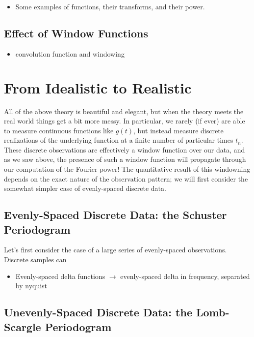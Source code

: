 \documentclass[preprint]{aastex}
\begin{document}
\begin{itemize}
\item Some examples of functions, their transforms, and their power.
\end{itemize}

\subsection{Effect of Window Functions}

\begin{itemize}
\item convolution function and windowing
\end{itemize}

\section{From Idealistic to Realistic}

All of the above theory is beautiful and elegant, but when the theory meets the real world things get a bit more messy.
In particular, we rarely (if ever) are able to measure continuous functions like $g(t)$, but instead measure discrete realizations of the underlying function at a finite number of particular times $t_n$.
These discrete observations are effectively a window function over our data, and as we saw above, the presence of such a window function will propagate through our computation of the Fourier power!
The quantitative result of this windowning depends on the exact nature of the observation pattern; we will first consider the somewhat simpler case of evenly-spaced discrete data.

\subsection{Evenly-Spaced Discrete Data: the Schuster Periodogram}

Let's first consider the case of a large series of evenly-spaced observations.
Discrete samples can


\begin{itemize}
\item Evenly-spaced delta functions $\to$ evenly-spaced delta in frequency, separated by nyquist
\end{itemize}

\subsection{Unevenly-Spaced Discrete Data: the Lomb-Scargle Periodogram}
\end{document}
